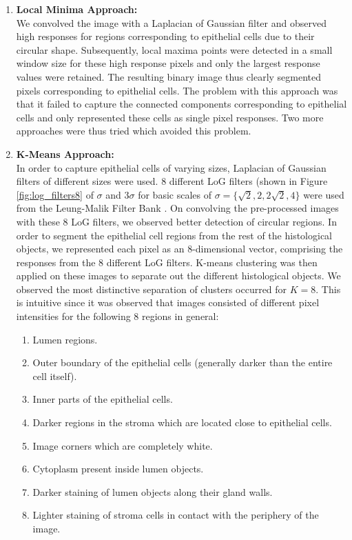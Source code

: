\begin{enumerate}
\item \textbf{Local Minima Approach:}\\
We convolved the image with a Laplacian of Gaussian filter and observed high responses for regions corresponding to epithelial cells due to their circular shape. Subsequently, local maxima points were detected in a small window size for these high response pixels and only the largest response values were retained. The resulting binary image thus clearly segmented pixels corresponding to epithelial cells. The problem with this approach was that it failed to capture the connected components corresponding to epithelial cells and only represented these cells as single pixel responses. Two more approaches were thus tried which avoided this problem.

\item \textbf{K-Means Approach:}\\
In order to capture epithelial cells of varying sizes, Laplacian of Gaussian filters of different sizes were used. 8 different LoG filters (shown in Figure \ref{fig:log_filters8} of $\sigma$ and $3 \sigma$ for basic scales of $\sigma = \{\sqrt{2}, 2, 2\sqrt{2}, 4\}$ were used from the Leung-Malik Filter Bank \cite{lmfb}. On convolving the pre-processed images with these 8 LoG filters, we observed better detection of circular regions. In order to segment the epithelial cell regions from the rest of the histological objects, we represented each pixel as an 8-dimensional vector, comprising the responses from the 8 different LoG filters. K-means clustering was then applied on these images to separate out the different histological objects. We observed the most distinctive separation of clusters occurred for $K = 8$. This is intuitive since it was observed that images consisted of different pixel intensities for the following 8 regions in general:


\begin{enumerate}

\item Lumen regions.
\item Outer boundary of the epithelial cells (generally darker than the entire cell itself).
\item Inner parts of the epithelial cells.
\item Darker regions in the stroma which are located close to epithelial cells.
\item Image corners which are completely white.
\item Cytoplasm present inside lumen objects.
\item Darker staining of lumen objects along their gland walls.
\item Lighter staining of stroma cells in contact with the periphery of the image.


\end{enumerate}
\end{enumerate}

